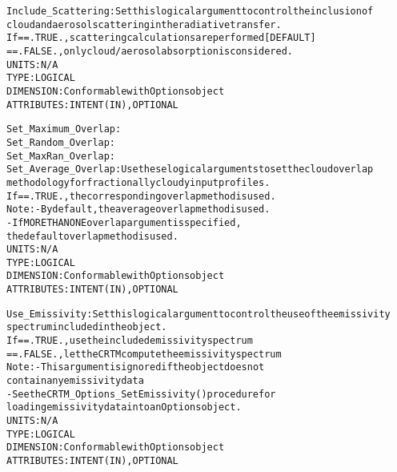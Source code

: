 \begin{alltt}
    Include_Scattering:       Set this logical argument to control the inclusion of
                              cloud and aerosol scattering in the radiative transfer.
                              If == .TRUE. , scattering calculations are performed [DEFAULT]
                                 == .FALSE., only cloud/aerosol absorption is considered.
                              UNITS:      N/A
                              TYPE:       LOGICAL
                              DIMENSION:  Conformable with Options object
                              ATTRIBUTES: INTENT(IN), OPTIONAL
                           
    Set_Maximum_Overlap:      
    Set_Random_Overlap:       
    Set_MaxRan_Overlap:       
    Set_Average_Overlap:      Use these logical arguments to set the cloud overlap 
                              methodology for fractionally cloudy input profiles.
                              If == .TRUE. , the corresponding overlap method is used.
                              Note: - By default, the average overlap method is used.
                                    - If MORE THAN ONE overlap argument is specified,
                                      the default overlap method is used.
                              UNITS:      N/A
                              TYPE:       LOGICAL
                              DIMENSION:  Conformable with Options object
                              ATTRIBUTES: INTENT(IN), OPTIONAL
 
    Use_Emissivity:           Set this logical argument to control the use of the emissivity
                              spectrum included in the object.
                              If == .TRUE. , use the included emissivity spectrum
                                 == .FALSE., let the CRTM compute the emissivity spectrum
                              Note: - This argument is ignored if the object does not
                                      contain any emissivity data
                                    - See the CRTM_Options_SetEmissivity() procedure for
                                      loading emissivity data into an Options object.
                              UNITS:      N/A
                              TYPE:       LOGICAL
                              DIMENSION:  Conformable with Options object
                              ATTRIBUTES: INTENT(IN), OPTIONAL
                           

\end{alltt}
